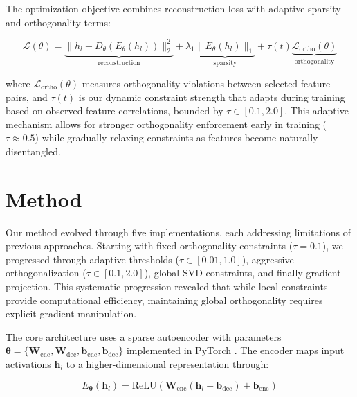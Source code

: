 \documentclass{article} %
\begin{document}
The optimization objective combines reconstruction loss with adaptive sparsity and orthogonality terms:

\begin{equation}
    \mathcal{L}(\theta) = \underbrace{\|h_l - D_{\theta}(E_{\theta}(h_l))\|_2^2}_{\text{reconstruction}} + \lambda_1 \underbrace{\|E_{\theta}(h_l)\|_1}_{\text{sparsity}} + \tau(t) \underbrace{\mathcal{L}_{\text{ortho}}(\theta)}_{\text{orthogonality}}
\end{equation}

where $\mathcal{L}_{\text{ortho}}(\theta)$ measures orthogonality violations between selected feature pairs, and $\tau(t)$ is our dynamic constraint strength that adapts during training based on observed feature correlations, bounded by $\tau \in [0.1, 2.0]$. This adaptive mechanism allows for stronger orthogonality enforcement early in training ($\tau \approx 0.5$) while gradually relaxing constraints as features become naturally disentangled.

\section{Method}
\label{sec:method}

Our method evolved through five implementations, each addressing limitations of previous approaches. Starting with fixed orthogonality constraints ($\tau = 0.1$), we progressed through adaptive thresholds ($\tau \in [0.01, 1.0]$), aggressive orthogonalization ($\tau \in [0.1, 2.0]$), global SVD constraints, and finally gradient projection. This systematic progression revealed that while local constraints provide computational efficiency, maintaining global orthogonality requires explicit gradient manipulation.

The core architecture uses a sparse autoencoder with parameters $\boldsymbol{\theta} = \{\mathbf{W}_{\text{enc}}, \mathbf{W}_{\text{dec}}, \mathbf{b}_{\text{enc}}, \mathbf{b}_{\text{dec}}\}$ implemented in PyTorch \cite{paszke2019pytorch}. The encoder maps input activations $\mathbf{h}_l$ to a higher-dimensional representation through:

\begin{equation}
    E_{\boldsymbol{\theta}}(\mathbf{h}_l) = \text{ReLU}(\mathbf{W}_{\text{enc}}(\mathbf{h}_l - \mathbf{b}_{\text{dec}}) + \mathbf{b}_{\text{enc}})
\end{equation}
\end{document}
